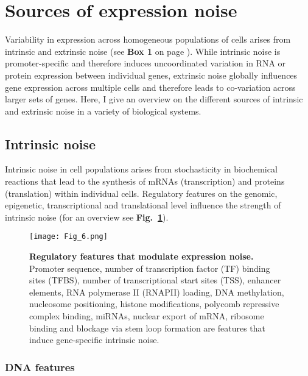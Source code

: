 
\section{Sources of expression noise} 

Variability in expression across homogeneous populations of cells arises from intrinsic and extrinsic noise (see \textbf{Box 1} on page \pageref{box1}). 
While intrinsic noise is promoter-specific and therefore induces uncoordinated variation in RNA or protein expression between individual genes, extrinsic noise globally influences gene expression across multiple cells and therefore leads to co-variation across larger sets of genes. 
Here, I give an overview on the different sources of intrinsic and extrinsic noise in a variety of biological systems.

\subsection{Intrinsic noise}

Intrinsic noise in cell populations arises from stochasticity in biochemical reactions that lead to the synthesis of mRNAs (transcription) and proteins (translation) within individual cells. 
Regulatory features on the genomic, epigenetic, transcriptional and translational level influence the strength of intrinsic noise (for an overview see \textbf{Fig.~\ref{fig0:overview_intrinsic}}).

\begin{figure}[!h]
\centering
\texttt{[image: Fig\_6.png]}
\caption[Regulatory features that modulate expression noise]{\textbf{Regulatory features that modulate expression noise.}\\
Promoter sequence, number of transcription factor (TF) binding sites (TFBS), number of transcriptional start sites (TSS), enhancer elements, RNA polymerase II (RNAPII) loading, DNA methylation, nucleosome positioning, histone modifications, polycomb repressive complex binding, \glspl{miRNA}, nuclear export of mRNA, ribosome binding and blockage via stem loop formation are features that induce gene-specific intrinsic noise.}
\label{fig0:overview_intrinsic}
\end{figure}

\subsubsection{DNA features}

